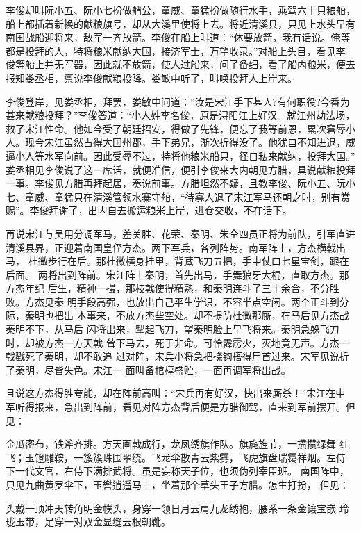 李俊却叫阮小五、阮小七扮做艄公，童威、童猛扮做随行水手，乘驾六十只粮船，
船上都插着新换的献粮旗号，却从大溪里使将上去。将近清溪县，只见上水头早有
南国战船迎将来，敌军一齐放箭。李俊在船上叫道：“休要放箭，我有话说。俺等
都是投拜的人，特将粮米献纳大国，接济军士，万望收录。”对船上头目，看见李
俊等船上并无军器，因此就不放箭，使人过船来，问了备细，看了船内粮米，便去
报知娄丞相，禀说李俊献粮投降。娄敏中听了，叫唤投拜人上岸来。

李俊登岸，见娄丞相，拜罢，娄敏中问道：“汝是宋江手下甚人?有何职役?今番为
甚来献粮投拜？”李俊答道：“小人姓李名俊，原是浔阳江上好汉。就江州劫法场，
救了宋江性命。他如今受了朝廷招安，得做了先锋，便忘了我等前恩，累次窘辱小
人。现今宋江虽然占得大国州郡，手下弟兄，渐次折得没了。他犹自不知进退，威
逼小人等水军向前。因此受辱不过，特将他粮米船只，径自私来献纳，投拜大国。”
娄丞相见李俊说了这一席话，就便准信，便引李俊来大内朝见方腊，具说献粮投拜
一事。李俊见方腊再拜起居，奏说前事。方腊坦然不疑，且教李俊、阮小五、阮小
七、童威、童猛只在清溪管领水寨守船，“待寡人退了宋江军马还朝之时，别有赏
赐”。李俊拜谢了，出内自去搬运粮米上岸，进仓交收，不在话下。

再说宋江与吴用分调军马，差关胜、花荣、秦明、朱仝四员正将为前队，引军直进
清溪县界，正迎着南国皇侄方杰。两下军兵，各列阵势。南军阵上，方杰横戟出马，
杜微步行在后。那杜微横身挂甲，背藏飞刀五把，手中仗口七星宝剑，跟在后面。
两将出到阵前。宋江阵上秦明，首先出马，手舞狼牙大棍，直取方杰。那方杰年纪
后生，精神一撮，那枝戟使得精熟，和秦明连斗了三十余合，不分胜败。方杰见秦
明手段高强，也放出自己平生学识，不容半点空闲。两个正斗到分际，秦明也把出
本事来，不放方杰些空处。却不提防杜微那厮，在马后见方杰战秦明不下，从马后
闪将出来，掣起飞刀，望秦明脸上早飞将来。秦明急躲飞刀时，却被方杰一方天戟
耸下马去，死于非命。可怜霹雳火，灭地竟无声。方杰一戟戳死了秦明，却不敢追
过对阵，宋兵小将急把挠钩搭得尸首过来。宋军见说折了秦明，尽皆失色。宋江一
面叫备棺椁盛贮，一面再调军将出战。

且说这方杰得胜夸能，却在阵前高叫：“宋兵再有好汉，快出来厮杀！”宋江在中
军听得报来，急出到阵前，看见对阵方杰背后便是方腊御驾，直来到军前摆开。但
见：

金瓜密布，铁斧齐排。方天画戟成行，龙凤绣旗作队。旗旄旌节，一攒攒绿舞
红飞；玉镫雕鞍，一簇簇珠围翠绕。飞龙伞散青云紫雾，飞虎旗盘瑞霭祥烟。左侍
下一代文官，右侍下满排武将。虽是妄称天子位，也须伪列宰臣班。
南国阵中，只见九曲黄罗伞下，玉辔逍遥马上，坐着那个草头王子方腊。怎生打扮，
但见：

头戴一顶冲天转角明金幞头，身穿一领日月云肩九龙绣袍，腰系一条金镶宝嵌
玲珑玉带，足穿一对双金显缝云根朝靴。

